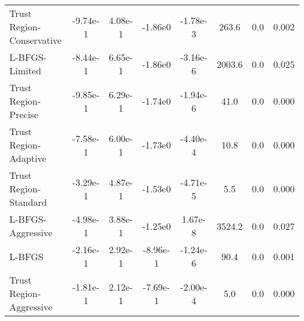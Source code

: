 \documentclass{article}
\begin{document}
\begin{table}[htbp]
{\begin{tabular}{p{2.5cm}*{7}{c}}
Trust Region-Conservative & -9.74e-1 & 4.08e-1 & -1.86e0 & -1.78e-3 & 263.6 & 0.0 & 0.002 \\
L-BFGS-Limited & -8.44e-1 & 6.65e-1 & -1.86e0 & -3.16e-6 & 2003.6 & 0.0 & 0.025 \\
Trust Region-Precise & -9.85e-1 & 6.29e-1 & -1.74e0 & -1.94e-6 & 41.0 & 0.0 & 0.000 \\
Trust Region-Adaptive & -7.58e-1 & 6.00e-1 & -1.73e0 & -4.40e-4 & 10.8 & 0.0 & 0.000 \\
Trust Region-Standard & -3.29e-1 & 4.87e-1 & -1.53e0 & -4.71e-5 & 5.5 & 0.0 & 0.000 \\
L-BFGS-Aggressive & -4.98e-1 & 3.88e-1 & -1.25e0 & 1.67e-8 & 3524.2 & 0.0 & 0.027 \\
L-BFGS & -2.16e-1 & 2.92e-1 & -8.96e-1 & -1.24e-6 & 90.4 & 0.0 & 0.001 \\
Trust Region-Aggressive & -1.81e-1 & 2.12e-1 & -7.69e-1 & -2.00e-4 & 5.0 & 0.0 & 0.000 \\
\bottomrule
\end{tabular}
}
\end{table}
\end{document}
